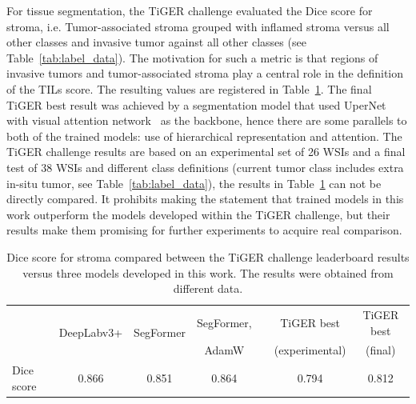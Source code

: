 For tissue segmentation, the TiGER challenge evaluated the Dice score for stroma,
i.e. Tumor-associated stroma grouped with inflamed stroma versus all other classes
and invasive tumor against all other classes (see Table~\ref{tab:label_data}). 
The motivation for such a metric is that regions of invasive tumors and 
tumor-associated stroma play a central role in the definition of the TILs score.
The resulting values are registered in Table~\ref{tab:tissue_compare}. 
The final TiGER best result was achieved by a segmentation model that used
UperNet~\cite{xiao2018unified} with visual attention network~\cite{guo2022visual}
as the backbone, hence there are some parallels to both of the trained models:
use of hierarchical representation and attention.
The TiGER challenge results are based on an experimental set of 26 WSIs
and a final test of 38 WSIs and different class definitions (current tumor
class includes extra in-situ tumor, see Table~\ref{tab:label_data}),
the results in Table~\ref{tab:tissue_compare} can not be directly compared.
It prohibits making the statement that trained models in this work outperform the models
developed within the TiGER challenge, but their results make them promising for
further experiments to acquire real comparison.

\begin{table}[h!]
    \centering
    \begin{tabular}{ l c c c c c c }
        \hline
         & \multirow{2}{*}{DeepLabv3+} & \multirow{2}{*}{SegFormer} & SegFormer, & & TiGER best & TiGER best\\
         &  &  & AdamW & & (experimental) & (final)\\
        \hline
        Dice score & 0.866 & 0.851 & 0.864 & & 0.794 & 0.812 \\
        \hline
    \end{tabular}
\caption{\label{tab:tissue_compare} Dice score for stroma compared between the TiGER challenge leaderboard
results versus three models developed in this work. The results were obtained from different data.}
\end{table}

